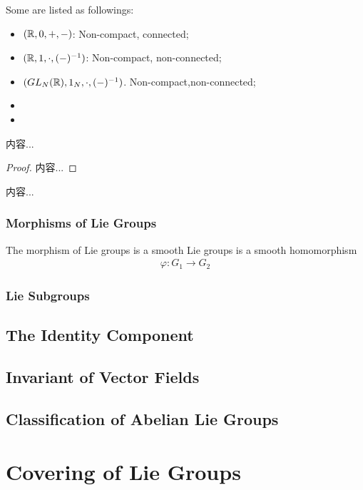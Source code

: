 \documentclass[Total.tex]{subfiles}
\begin{document}
			\begin{example}
				Some are listed as followings:
				\begin{itemize}
					\item $(\mathbb{R},0,+,-)$: Non-compact, connected;
					\item $(\mathbb{R},1,\cdot,(-)^{-1})$: Non-compact, non-connected;
					
					\item $(GL_N(\mathbb{R}),1_N,\cdot,(-)^{-1})$. Non-compact,non-connected;
					\item 
					\item 
				\end{itemize}
			\end{example}
			\begin{lemma}
				内容...
			\end{lemma}
			\begin{proof}
				内容...
			\end{proof}
			\begin{corollary}
				内容...
			\end{corollary}
			\subsubsection{Morphisms of Lie Groups}
			
			
			\begin{Def}
				The morphism of Lie groups is a smooth Lie groups is a smooth homomorphism
				\begin{gather*}
					\varphi:G_1\rightarrow G_2
				\end{gather*}
			\end{Def}
			\subsubsection{Lie Subgroups}
			\subsection{The Identity Component}
			\subsection{Invariant of Vector Fields}
			\subsection{Classification of Abelian Lie Groups}
		\section{Covering of Lie Groups}
\end{document}
